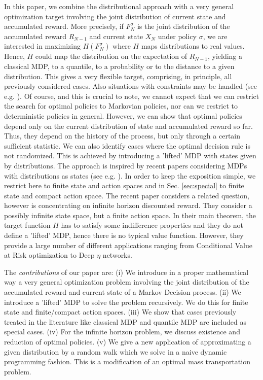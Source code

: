 \documentclass[reqno, 12pt]{amsart}%
\theoremstyle{definition}
\numberwithin{equation}{section} \numberwithin{theorem}{section}
\begin{document}
In this paper, we combine the distributional approach with a very general optimization target involving the joint distribution of current state and accumulated reward. More precisely, if $F_N^\sigma$ is the joint distribution of the accumulated reward $R_{N-1}$ and current state $X_N$ under policy $\sigma$, we are interested in maximizing $H(F_N^\sigma)$ where $H$ maps distributions to real values. Hence, $H$ could map the distribution on the expectation of $R_{N-1}$, yielding a classical MDP, to a quantile, to a probability or to the distance to a given distribution. This gives a very flexible target, comprising, in principle, all previously considered cases.  Also situations with constraints may be handled (see e.g. \cite{altman2021constrained, basak2001value}). Of course, and this is crucial to note, we cannot expect that we can restrict the search for optimal policies to Markovian policies, nor can we restrict to deterministic policies in general. However, we can show that optimal policies depend only on the current distribution of state and accumulated reward so far. Thus, they depend on the history of the process, but only through a certain sufficient statistic. We can also identify cases where the optimal decision rule is not randomized. This is achieved by introducing a 'lifted' MDP with states given by distributions. The approach is inspired by recent papers considering  MDPs with distributions as states (see e.g. \cite{bauerle2024time}). In order to keep the exposition simple, we restrict here to finite state and action spaces and in Sec. \ref{sec:special} to finite state and compact action space. The recent paper \cite{pires2025optimizing} considers a related question, however is concentrating on infinite horizon discounted reward. They consider a possibly infinite state space, but a finite action space. In their main theorem, the target function $H$ has to satisfy some indifference properties and they do not define a 'lifted' MDP, hence there is no typical value function. However, they provide a large number of different applications ranging from Conditional Value at Risk optimization to Deep $\eta$ networks. 

The {\em contributions} of our paper are: (i) We introduce in a proper mathematical way a very general optimization problem involving the  joint distribution of the accumulated reward  and current state of a Markov Decision process. (ii) We introduce a 'lifted' MDP to solve the problem recursively. We do this for finite state and finite/compact action spaces. (iii) We show that cases previously treated in the literature like classical MDP and quantile MDP are included as special cases.   (iv) For the infinite horizon problem, we discuss existence and reduction of optimal policies. (v) We give a new application of approximating a given distribution by a random walk which we solve in a naive dynamic programming fashion. This is a modification of an optimal mass transportation problem.
\end{document}
